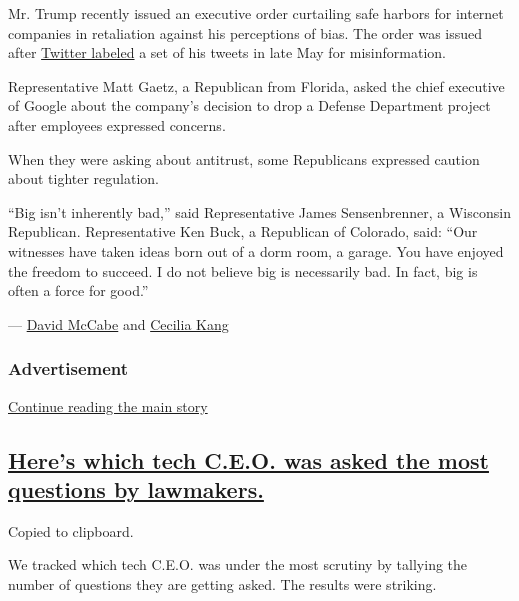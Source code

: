 Mr. Trump recently issued an executive order curtailing safe harbors for
internet companies in retaliation against his perceptions of bias. The
order was issued after
\href{https://slack-redir.net/link?url=https\%3A\%2F\%2Fwww.nytimes3xbfgragh.onion\%2F2020\%2F05\%2F26\%2Ftechnology\%2Ftwitter-trump-mail-in-ballots.html}{Twitter
labeled} a set of his tweets in late May for misinformation.

Representative Matt Gaetz, a Republican from Florida, asked the chief
executive of Google about the company's decision to drop a Defense
Department project after employees expressed concerns.

When they were asking about antitrust, some Republicans expressed
caution about tighter regulation.

``Big isn't inherently bad,'' said Representative James Sensenbrenner, a
Wisconsin Republican. Representative Ken Buck, a Republican of Colorado,
said: ``Our witnesses have taken ideas born out of a dorm room, a
garage. You have enjoyed the freedom to succeed. I do not believe big is
necessarily bad. In fact, big is often a force for good.''

--- \href{https://www.nytimes3xbfgragh.onion/by/david-mccabe}{David
McCabe} and
\href{https://www.nytimes3xbfgragh.onion/by/cecilia-kang}{Cecilia Kang}

\hypertarget{advertisement}{%
\subsubsection{Advertisement}\label{advertisement}}

\protect\hyperlink{after-dfp-ad-mid1}{Continue reading the main story}

\hypertarget{heres-which-tech-ceo-was-asked-the-most-questions-by-lawmakers}{%
\subsection{\texorpdfstring{\protect\hyperlink{heres-which-tech-ceo-was-asked-the-most-questions-by-lawmakers}{Here's
which tech C.E.O. was asked the most questions by
lawmakers.}}{Here's which tech C.E.O. was asked the most questions by lawmakers.}}\label{heres-which-tech-ceo-was-asked-the-most-questions-by-lawmakers}}

Copied to clipboard.

We tracked which tech C.E.O. was under the most scrutiny by tallying the
number of questions they are getting asked. The results were striking.

